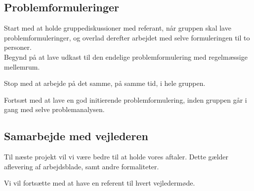 \documentclass[a4paper,12pt,oneside,article]{memoir}
\begin{document}
    

    \subsection{Problemformuleringer}

        Start med at holde gruppediskussioner med referant, når gruppen skal lave problemformuleringer, og overlad derefter arbejdet med selve formuleringen til to personer.\\
        Begynd på at lave udkast til den endelige problemformulering med regelmæssige mellemrum.

        Stop med at arbejde på det samme, på samme tid, i hele gruppen.

        Fortsæt med at lave en god initierende problemformulering, inden gruppen går i gang med selve problemanalysen.


    \subsection{Samarbejde med vejlederen}

    Til næste projekt vil vi være bedre til at holde vores aftaler. Dette gælder aflevering af arbejdsblade, samt andre formaliteter.

    Vi vil fortsætte med at have en referent til hvert vejledermøde.

\end{document}
